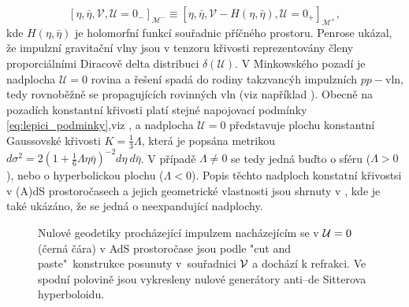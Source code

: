 \begin{equation}
    \label{eq:lepici_podminky}
\left[\eta, \bar{\eta}, \mathcal{V}, \mathcal{U}=0_- \right]_{\mathcal{M}^-} \equiv 
\left[\eta, \bar{\eta}, \mathcal{V}-H\left(\eta, \bar{\eta}\right), \mathcal{U}=0_+  \right]_{\mathcal{M}^+},
\end{equation}
kde $H(\eta, \bar{\eta})$ je holomorfní funkcí souřadnic příčného prostoru. Penrose \cite{Penrose:1972xrn} ukázal, že impulzní gravitační vlny
jsou v tenzoru křivosti reprezentovány členy proporciálními Diracově delta distribuci $\delta(\mathcal{U})$.
V Minkowského pozadí je nadplocha $\mathcal{U}=0$ rovina a řešení spadá do rodiny takzvancýh impulzních $pp-$vln, tedy
rovnoběžně se propagujících rovinných vln (viz například \cite{griffiths_podolsky_2009}). Obecně na pozadích konstantní křivosti platí stejné napojovací podmínky
\eqref{eq:lepici_podminky},viz \cite{Podolsky:2014ysa}, a nadplocha $\mathcal{U}=0$ představuje plochu konstantní Gaussovské křivosti 
$K=\frac{1}{3}\Lambda$, která je popsána metrikou $d\sigma^2=2(1+\frac{1}{6}\Lambda \eta \bar{\eta})^{-2} 
d\eta~d\bar{\eta}$. V případě $\Lambda \neq 0$ se tedy jedná buďto o sféru
($\Lambda > 0$), nebo o hyperbolickou plochu ($\Lambda < 0$). Popis těchto nadploch konstatní křivostsi v (A)dS prostoročasech a
jejich geometrické vlastnosti jsou shrnuty v \cite{Podolsky:1997ri}, kde je také ukázáno,
že se jedná o neexpandující nadplochy.

\begin{figure}[H]
    \centering
    \caption{Nulové geodetiky procházející impulzem nacházejícím se v $\mathcal{U}=0$ (černá čára) v AdS prostoročase jsou podle "cut and paste"\ konstrukce posunuty
    v~souřadnici $\mathcal{V}$ a dochází k refrakci. Ve spodní polovině jsou vykresleny nulové generátory anti--de Sitterova hyperboloidu.}
\end{figure}

